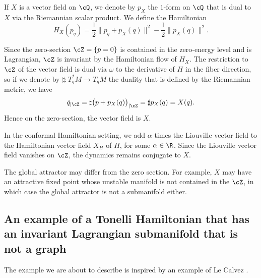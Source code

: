 If $X$ is a vector field on $\cQ$, we denote by $p_X$ the $1$-form on $\cQ$ that is dual to $X$ via the Riemannian scalar product. We define the Hamiltonian
\[
H_X(p_q)=\frac{1}{2}\| p_q+p_X(q)\|^2-\frac{1}{2}\| p_X(q)\|^2.
\]

Since the zero-section $\cZ=\{ p=0\}$ is contained in the zero-energy level and is Lagrangian, $\cZ$ is invariant by the Hamiltonian flow of $H_X$. The restriction to $\cZ$ of the vector field is dual via $\omega$ to the derivative of $H$ in the fiber direction, so if we denote by $\sharp: T_q^*M\to T_qM$ the duality that is defined by the Riemannian metric, we have
\[
\dot q_{|\cZ} = \sharp\big(p+p_X(q)\big)_{|\cZ}=\sharp p_X(q)=X(q).
\]
Hence on the zero-section, the vector field is $X$.

In the conformal Hamiltonian setting, we add $\alpha$ times the Liouville vector field to the Hamiltonian vector field $X_H$ of $H$, for some $\alpha \in \R$. Since the Liouville vector field vanishes on $\cZ$, the dynamics remains conjugate to $X$.

\begin{remark}
The global attractor may differ from the zero section. For example, $X$ may have an attractive fixed point whose unstable manifold is not contained in the $\cZ$, in which case the global attractor is not a submanifold either.
\end{remark}

\subsection{An example of a Tonelli Hamiltonian that has an invariant Lagrangian submanifold that is not a graph}\label{secBir}

The example we are about to describe is inspired by an example of Le Calvez \cite{LeCalvez1988}.

